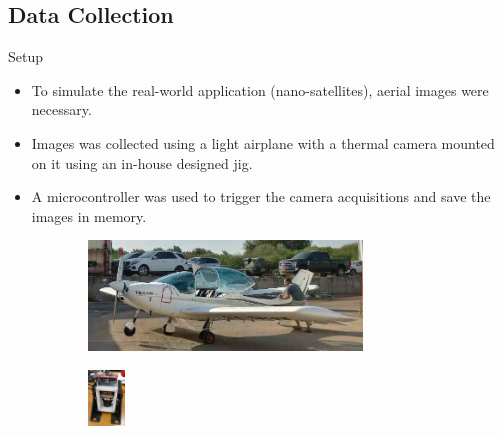 
\subsection*{Data Collection} \label{apndx:data_collection}

\begin{frame}{Setup}
  \begin{itemize}
      \item To simulate the real-world application (nano-satellites), aerial images were necessary.
      \item Images was collected using a light airplane with a thermal camera mounted on it using an in-house designed jig.
      \item A microcontroller was used to trigger the camera acquisitions and save the images in memory.
  \end{itemize}
  \begin{figure}
      \begin{subfigure}[b]{0.49\textwidth}
          \centering
          \includegraphics[width=0.8\textwidth]{../figs/data/light_airplane.jpeg}
          \label{fig:design}
      \end{subfigure}
      \hfill
      \begin{subfigure}[b]{0.49\textwidth}
          \centering
          \includegraphics[width=1cm, height=1.5cm]{../figs/data/camera_jig_actual.jpeg}
          \label{fig:manufactured}
      \end{subfigure}
      \label{fig:camera_jig}
  \end{figure}
\end{frame}

